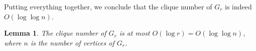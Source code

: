 \documentclass[11pt]{article}
\newtheorem{lemma}[theorem]{Lemma}
\providecommand{\todo}[2][]{}
\newcommand{\thomas}[1]{}
\begin{document}
%
%
Putting everything together, we conclude that the clique number of $ G_r $ is indeed $ O(\log \log n) $.
%
\begin{lemma}\label{lem:Gr_clique_loglogn}
    The clique number of $ G_r $ is at most $ O(\log r) = O(\log \log n) $, where $ n $ is the number of vertices of $ G_r $.
\end{lemma}
\end{document}
